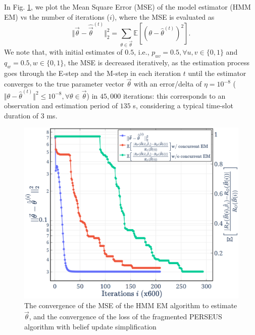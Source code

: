 \documentclass[12pt, draftcls, onecolumn]{IEEEtran}
\begin{document}
In Fig. \ref{Fig. 7}, we plot the Mean Square Error (MSE) of the model estimator (HMM EM) vs the number of iterations ($i$), where the MSE is evaluated as
\begin{equation}\label{32}
    \Vert\vec{\theta}-\hat{\vec{\theta}}^{(t)}\Vert_{2}^{2}=\sum_{\theta \in \vec{\theta}}\mathbb{E}[(\theta-\hat{\theta}^{(t)})^{2}].
\end{equation}
We note that, with initial estimates of $0.5$, i.e., $p_{uv}{=}0.5,{\forall}u,v{\in}\{0,1\}$ and $q_{w}{=}0.5,w{\in}\{0,1\}$, the MSE is decreased iteratively, as the estimation process goes through the E-step and the M-step in each iteration $t$ until the estimator converges \cite{Rabiner_1989} to the true parameter vector $\vec{\theta}$ with an error/delta of $\eta{=}10^{-8}$ ($\Vert\theta{-}\hat{\theta}^{(t)}\Vert^{2}{\leq}10^{-8},{\forall}\theta{\in}\vec{\theta}$) in $45,000$ iterations: this corresponds to an observation and estimation period of $135$ s, considering a typical time-slot duration of $3$ ms.
\begin{figure} [t]
    \centerline{
    \includegraphics[width=0.8\linewidth]{figures/Minerva_HMM_EM_and_PERSEUS_plot.png}}
    \vspace{-6mm}
    \caption{The convergence of the MSE of the HMM EM algorithm to estimate $\vec{\theta}$, and the convergence of the loss of the fragmented PERSEUS algorithm with belief update simplification}
    \vspace{-7mm}
    \label{Fig. 7}
\end{figure}
\end{document}
